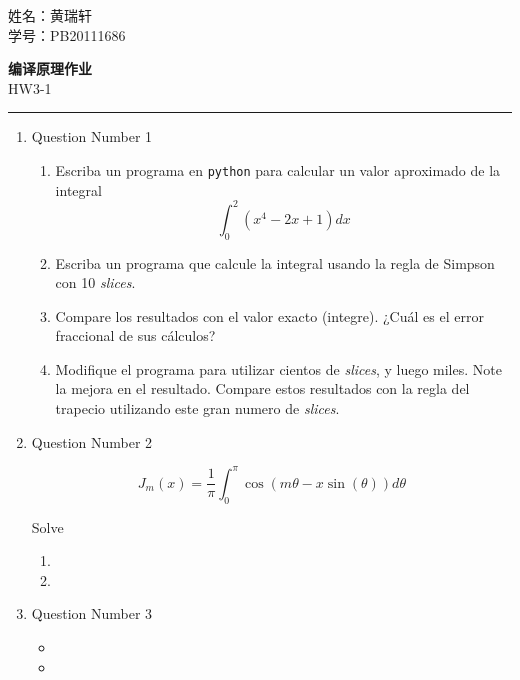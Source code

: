 \documentclass[11pt,letterpaper]{article}
\begin{document}
\pagestyle{plain}

\begin{flushleft}
姓名：黄瑞轩\\
学号：PB20111686
\end{flushleft}
 
\begin{center}\vspace{-1cm}
\textbf{\large 编译原理作业}\\
HW3-1
\end{center}

 
\rule{\linewidth}{0.1mm}

\bigskip
\bigskip

\begin{enumerate}

\item Question Number 1

\begin{enumerate}
	\item Escriba un programa en \verb|python| para calcular un valor aproximado de la integral
	\begin{equation}
	\int_0^2\left(x^4 - 2x +1 \right)dx
	\end{equation}
	\item Escriba un programa que calcule la integral usando la regla de Simpson con 10 \textit{slices}.
	\item Compare los resultados con el valor exacto (integre). ¿Cuál es el error fraccional de sus cálculos?
	\item Modifique el programa para utilizar cientos de \textit{slices}, y luego miles. Note la mejora en el resultado. Compare estos resultados con la regla del trapecio utilizando este gran numero de \textit{slices}.
\end{enumerate}

\item Question Number 2

\lipsum[2]

\noindent

\begin{equation}
J_m(x)=\frac{1}{\pi}\int_0^\pi \cos(m\theta-x\sin(\theta))d\theta
\end{equation}

\noindent
\lipsum[1]

Solve

\begin{enumerate}
	\item \lipsum[66]
	\item \lipsum[75]
\end{enumerate}

\item Question Number 3

\lipsum[23]
\begin{itemize}
	\item \lipsum[75]
    \item \lipsum[66]
\end{itemize}

\end{enumerate}
\end{document}
